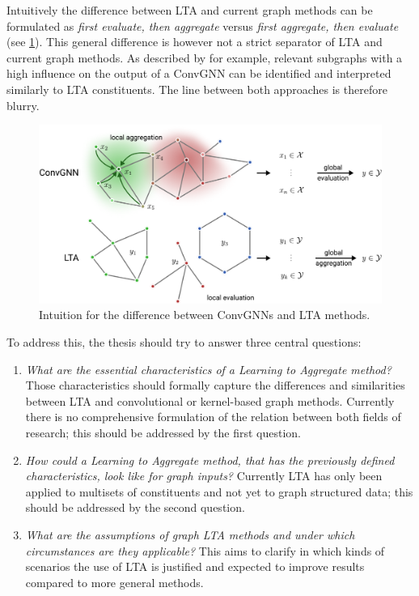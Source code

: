 \documentclass[12pt]{scrartcl}
\begin{document}
Intuitively the difference between LTA and current graph methods can be formulated as \textit{first evaluate, then aggregate} versus \textit{first aggregate, then evaluate} (see \cref{fig:gnnvslta}).
This general difference is however not a strict separator of LTA and current graph methods.
As described by \citet{Pope2018} for example, relevant subgraphs with a high influence on the output of a ConvGNN can be identified and interpreted similarly to LTA constituents.
The line between both approaches is therefore blurry.
\begin{figure}[h]
	\centering
	\includegraphics[width=0.9\linewidth]{GNNvsLTA.pdf}
	\caption{Intuition for the difference between ConvGNNs and LTA methods.}\label{fig:gnnvslta}
\end{figure}

To address this, the thesis should try to answer three central questions:
\begin{enumerate}
	\item \textit{What are the essential characteristics of a Learning to Aggregate method?}
		Those characteristics should formally capture the differences and similarities between LTA and convolutional or kernel-based graph methods.
		Currently there is no comprehensive formulation of the relation between both fields of research;
		this should be addressed by the first question.
	\item \textit{How could a Learning to Aggregate method, that has the previously defined characteristics, look like for graph inputs?}
		Currently LTA has only been applied to multisets of constituents and not yet to graph structured data;
		this should be addressed by the second question.
	\item \textit{What are the assumptions of graph LTA methods and under which circumstances are they applicable?}
		This aims to clarify in which kinds of scenarios the use of LTA is justified and expected to improve results compared to more general methods.
\end{enumerate}
\end{document}
